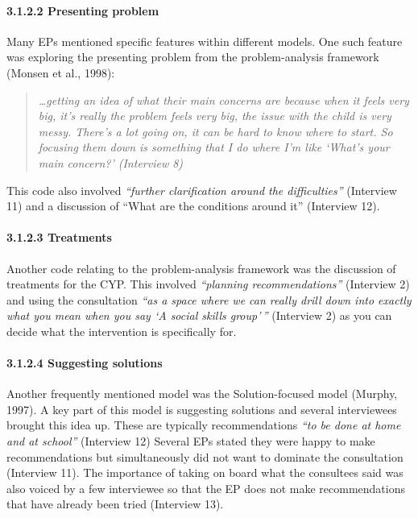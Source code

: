 \documentclass[
  english,
  man]{apa}
\let\oldparagraph\paragraph
\renewcommand{\paragraph}[1]{\oldparagraph{#1}\mbox{}}
\begin{document}
\hypertarget{presenting-problem}{%
\paragraph{3.1.2.2 Presenting problem}\label{presenting-problem}}

Many EPs mentioned specific features within different models. One such feature was exploring the presenting problem from the problem-analysis framework (Monsen et al., 1998):

\begin{quote}
\emph{\ldots getting an idea of what their main concerns are because when it feels
very big, it's really the problem feels very big, the issue with the
child is very messy. There's a lot going on, it can be hard to know
where to start. So focusing them down is something that I do where I'm
like `What's your main concern?' (Interview 8)}
\end{quote}

This code also involved \emph{``further clarification around the difficulties''} (Interview 11) and a discussion of ``What are the conditions around it'' (Interview 12).

\hypertarget{treatments}{%
\paragraph{3.1.2.3 Treatments}\label{treatments}}

Another code relating to the problem-analysis framework was the discussion of treatments for the CYP. This involved \emph{``planning recommendations''} (Interview 2) and using the consultation \emph{``as a space where we can really drill down into exactly what you mean when you say `A social skills group'\,''} (Interview 2) as you can decide what the intervention is specifically for.

\hypertarget{suggesting-solutions}{%
\paragraph{3.1.2.4 Suggesting solutions}\label{suggesting-solutions}}

Another frequently mentioned model was the Solution-focused model (Murphy, 1997). A key part of this model is suggesting solutions and several interviewees brought this idea up. These are typically recommendations \emph{``to be done at home and at school''} (Interview 12) Several EPs stated they were happy to make recommendations but simultaneously did not want to dominate the consultation (Interview 11). The importance of taking on board what the consultees said was also voiced by a few interviewee so that the EP does not make recommendations that have already been tried (Interview 13).
\end{document}

